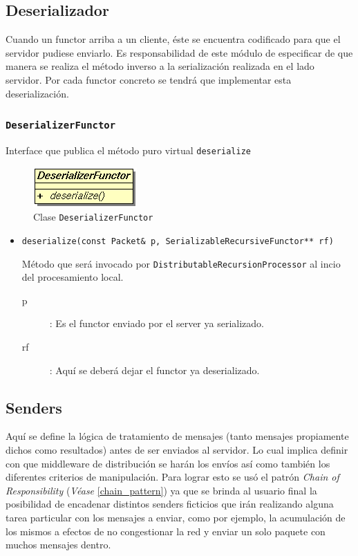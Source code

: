 \subsection{Deserializador}

Cuando un functor arriba a un cliente, éste se encuentra codificado para que el servidor pudiese enviarlo.
Es responsabilidad de este módulo de especificar de que manera se realiza el método inverso a la serialización
realizada en el lado servidor. Por cada functor concreto se tendrá que implementar esta deserialización.

    \subsubsection{\texttt{DeserializerFunctor}}
        Interface que publica el método puro virtual \texttt{deserialize}

        \begin{figure}[!htb] \hspace{4.8cm}
            \includegraphics[scale=0.70]{images/deserializer.png}
            \caption{Clase \texttt{DeserializerFunctor}}
             \label{Deserializer}
        \end{figure}

        \begin{itemize}
            \item \texttt{deserialize(const Packet\& p, SerializableRecursiveFunctor** rf)}

                Método que será invocado por \texttt{DistributableRecursionProcessor} al incio del procesamiento local.
                \begin{description}
                \item[p]: Es el functor enviado por el server ya serializado.
                \item[rf]: Aquí se deberá dejar el functor ya deserializado.
                \end{description}
        \end{itemize}
    
    
\subsection{Senders}

    Aquí se define la lógica de tratamiento de mensajes (tanto mensajes propiamente dichos como resultados) antes de
ser enviados al servidor. Lo cual implica definir con que middleware de distribución se harán los envíos así como
también los diferentes criterios de manipulación. Para lograr esto se usó el patrón \textit{Chain of Responsibility}
(\textit{Véase} \ref{chain_pattern}) ya que se brinda al usuario final la posibilidad de encadenar distintos senders
ficticios que irán realizando alguna tarea particular con los mensajes a enviar, como por ejemplo, la acumulación de los
mismos a efectos de no congestionar la red y enviar un solo paquete con muchos mensajes dentro.

